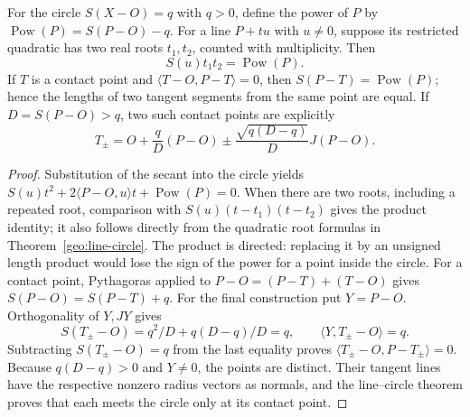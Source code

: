 \begin{theorem}
\label{geo:power}
For the circle $S(X-O)=q$ with $q>0$, define the power of $P$ by
$\operatorname{Pow}(P)=S(P-O)-q$.
For a line $P+tu$ with $u\ne0$, suppose its restricted quadratic has two
real roots $t_1,t_2$, counted with multiplicity. Then
\[
 S(u)t_1t_2=\operatorname{Pow}(P).
\]
If $T$ is a contact point and $\langle T-O,P-T\rangle=0$, then
$S(P-T)=\operatorname{Pow}(P)$; hence the lengths of two tangent segments
from the same point are equal. If $D=S(P-O)>q$, two such contact points
are explicitly
\[
 T_\pm=O+\frac qD(P-O)
       \mathbin{\pm}\frac{\sqrt{q(D-q)}}D J(P-O).
\]
\end{theorem}
\begin{proof}
Substitution of the secant into the circle yields
$S(u)t^2+2\langle P-O,u\rangle t+\operatorname{Pow}(P)=0$.
When there are two roots, including a repeated root, comparison with
$S(u)(t-t_1)(t-t_2)$ gives the product identity; it also follows directly
from the quadratic root formulas in Theorem~\ref{geo:line-circle}.
The product is directed: replacing it by an unsigned length product would
lose the sign of the power for a point inside the circle.
For a contact point, Pythagoras applied to
$P-O=(P-T)+(T-O)$ gives $S(P-O)=S(P-T)+q$.
For the final construction put $Y=P-O$. Orthogonality of $Y,JY$ gives
\[
 S(T_\pm-O)=q^2/D+q(D-q)/D=q,
 \qquad \langle Y,T_\pm-O\rangle=q.
\]
Subtracting $S(T_\pm-O)=q$ from the last equality proves
$\langle T_\pm-O,P-T_\pm\rangle=0$.
Because $q(D-q)>0$ and $Y\ne0$, the points are distinct. Their tangent
lines have the respective nonzero radius vectors as normals, and the
line--circle theorem proves that each meets the circle only at its contact point.
\end{proof}

